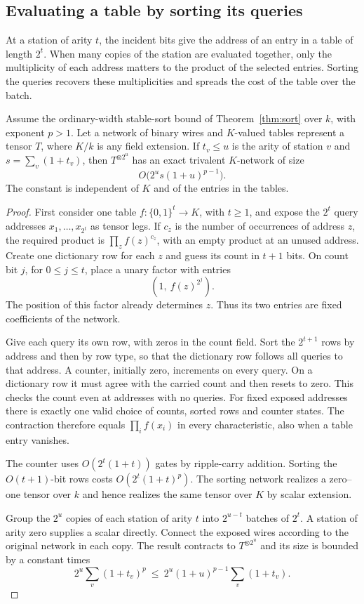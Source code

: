 \subsection{Evaluating a table by sorting its queries}

At a station of arity $t$, the incident bits give the address of an
entry in a table of length $2^t$. When many copies of the station are
evaluated together, only the multiplicity of each address matters to
the product of the selected entries. Sorting the queries recovers
these multiplicities and spreads the cost of the table over the batch.

\begin{lemma}\label{lem:batch-table}
Assume the ordinary-width stable-sort bound of Theorem~\ref{thm:sort}
over $k$, with exponent $p>1$. Let a network of binary wires and
$K$-valued tables represent a tensor $T$, where $K/k$ is any field
extension. If $t_v\le u$ is the arity of station $v$ and
$s=\sum_v(1+t_v)$, then $T^{\otimes 2^u}$ has an exact trivalent
$K$-network of size
\[
                  O\bigl(2^u s(1+u)^{p-1}\bigr).
\]
The constant is independent of $K$ and of the entries in the tables.
\end{lemma}

\begin{proof}
First consider one table $f\colon\{0,1\}^t\to K$, with $t\ge1$, and
expose the $2^t$ query addresses $x_1,\ldots,x_{2^t}$ as tensor legs.
If $c_z$ is the number of occurrences of address $z$, the required
product is $\prod_z f(z)^{c_z}$, with an empty product at an unused
address. Create one dictionary row for each $z$ and guess its count in
$t+1$ bits. On count bit $j$, for $0\le j\le t$, place a unary factor
with entries
\[
                    (1,\ f(z)^{2^j}).
\]
The position of this factor already determines $z$. Thus its two entries
are fixed coefficients of the network.

Give each query its own row, with zeros in the count field. Sort the
$2^{t+1}$ rows by address and then by row type, so that the dictionary
row follows all queries to that address. A counter, initially zero,
increments on every query. On a dictionary row it must agree with the
carried count and then resets to zero. This checks the count even at
addresses with no queries. For fixed exposed addresses there is exactly
one valid choice of counts, sorted rows and counter states. The
contraction therefore equals $\prod_i f(x_i)$ in every characteristic,
also when a table entry vanishes.

The counter uses $O(2^t(1+t))$ gates by ripple-carry addition.
Sorting the $O(t+1)$-bit rows costs $O(2^t(1+t)^p)$. The sorting
network realizes a zero--one tensor over $k$ and hence realizes the
same tensor over $K$ by scalar extension.

Group the $2^u$ copies of each station of arity $t$ into $2^{u-t}$
batches of $2^t$. A station of arity zero supplies a scalar directly.
Connect the exposed wires according to the original network in each
copy. The result contracts to $T^{\otimes 2^u}$ and its size is
bounded by a constant times
\[
  2^u\sum_v(1+t_v)^p
       \ \le\ 2^u(1+u)^{p-1}\sum_v(1+t_v).
\]
\end{proof}
